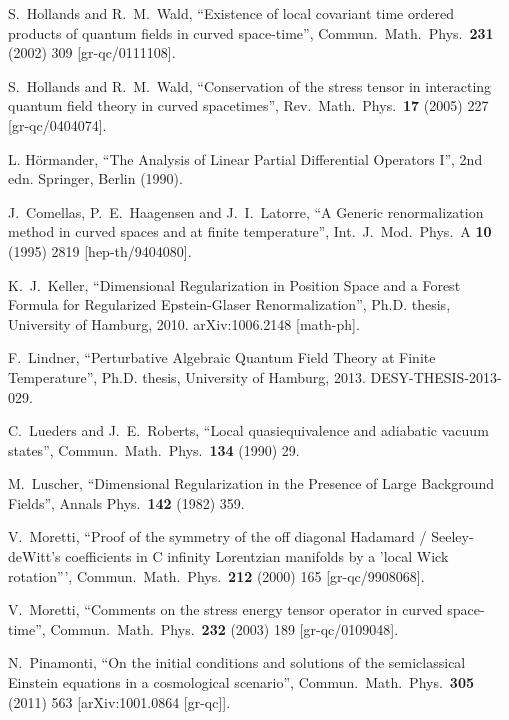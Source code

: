 \documentclass[a4paper,10pt,twoside]{article}
\numberwithin{equation}{section}
\newcounter{and}
\theoremstyle{plain}
\theoremstyle{definition}
\begin{document}
\begin{thebibliography}{100}
  S.~Hollands and R.~M.~Wald,
  ``Existence of local covariant time ordered products of quantum fields in curved space-time'',
  Commun.\ Math.\ Phys.\  {\bf 231} (2002) 309
  [gr-qc/0111108].  
  
  S.~Hollands and R.~M.~Wald,
  ``Conservation of the stress tensor in interacting quantum field theory in curved spacetimes'',
  Rev.\ Math.\ Phys.\  {\bf 17} (2005) 227
  [gr-qc/0404074]. 

  L. H\"ormander,
  ``The Analysis of Linear Partial Differential Operators I'',
  2nd edn. Springer, Berlin (1990).

  J.~Comellas, P.~E.~Haagensen and J.~I.~Latorre,
  ``A Generic renormalization method in curved spaces and at finite temperature'',
  Int.\ J.\ Mod.\ Phys.\ A {\bf 10} (1995) 2819
  [hep-th/9404080]. 
  
  K.~J.~Keller,
  ``Dimensional Regularization in Position Space and a Forest Formula for Regularized Epstein-Glaser Renormalization'',
  Ph.D. thesis, University of Hamburg, 2010.
  arXiv:1006.2148 [math-ph].

  F.~Lindner,
  ``Perturbative Algebraic Quantum Field Theory at Finite Temperature'',
  Ph.D. thesis, University of Hamburg, 2013.
  DESY-THESIS-2013-029.

  C.~Lueders and J.~E.~Roberts,
  ``Local quasiequivalence and adiabatic vacuum states'',
  Commun.\ Math.\ Phys.\  {\bf 134} (1990) 29.  

  M.~Luscher,
  ``Dimensional Regularization in the Presence of Large Background Fields'',
  Annals Phys.\  {\bf 142} (1982) 359. 

  V.~Moretti,
  ``Proof of the symmetry of the off diagonal Hadamard / Seeley-deWitt's coefficients in C infinity Lorentzian manifolds by a 'local Wick rotation''',
  Commun.\ Math.\ Phys.\  {\bf 212} (2000) 165
  [gr-qc/9908068].  
  
  V.~Moretti,
  ``Comments on the stress energy tensor operator in curved space-time'',
  Commun.\ Math.\ Phys.\  {\bf 232} (2003) 189
  [gr-qc/0109048].

  N.~Pinamonti,
  ``On the initial conditions and solutions of the semiclassical Einstein equations in a cosmological scenario'',
  Commun.\ Math.\ Phys.\  {\bf 305} (2011) 563
  [arXiv:1001.0864 [gr-qc]].
  

\end{thebibliography}
\end{document}
